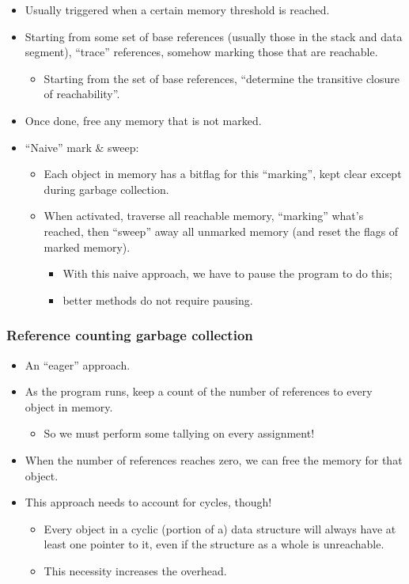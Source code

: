 \documentclass[11pt]{article}
\theoremstyle{definition}
\begin{document}
\begin{itemize}
\item Usually triggered when a certain memory threshold is reached.
\item Starting from some set of base references
(usually those in the stack and data segment),
“trace” references, somehow marking those that are reachable.
\begin{itemize}
\item Starting from the set of base references,
“determine the transitive closure of reachability”.
\end{itemize}
\item Once done, free any memory that is not marked.
\item “Naive” mark \& sweep:
\begin{itemize}
\item Each object in memory has a bitflag for this “marking”,
kept clear except during garbage collection.
\item When activated, traverse all reachable memory,
“marking” what's reached, then “sweep” away all unmarked memory
(and reset the flags of marked memory).
\begin{itemize}
\item With this naive approach, we have to pause the program to do this;
\item better methods do not require pausing.
\end{itemize}
\end{itemize}
\end{itemize}

\subsubsection{Reference counting garbage collection}
\label{sec:org1a27432}

\begin{itemize}
\item An “eager” approach.
\item As the program runs, keep a count of the number of references
to every object in memory.
\begin{itemize}
\item So we must perform some tallying on every assignment!
\end{itemize}
\item When the number of references reaches zero, we can free the memory
for that object.
\item This approach needs to account for cycles, though!
\begin{itemize}
\item Every object in a cyclic (portion of a) data structure
will always have at least one pointer to it,
even if the structure as a whole is unreachable.
\item This necessity increases the overhead.
\end{itemize}
\end{itemize}
\end{document}
